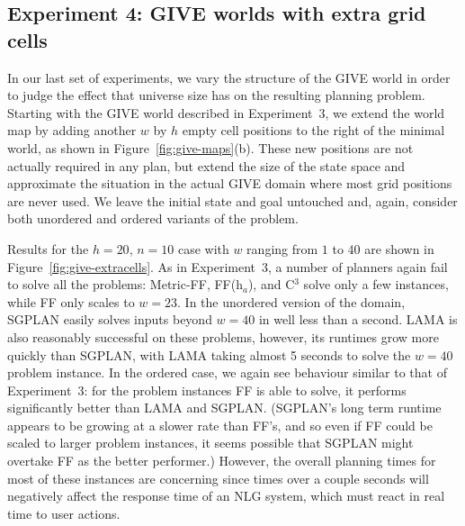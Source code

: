 \subsection{Experiment 4: GIVE worlds with extra grid cells}
\label{sec:experiment-4:-give}

In our last set of experiments, we vary the structure of the GIVE world in order
to judge the effect that universe size has on the resulting planning problem.
Starting with the GIVE world described in Experiment~3, we extend the world map
by adding another $w$ by $h$ empty cell positions to the right of the minimal
world, as shown in Figure~\ref{fig:give-maps}(b). These new positions are not
actually required in any plan, but extend the size of the state space and
approximate the situation in the actual GIVE domain where most grid positions
are never used. We leave the initial state and goal untouched and, again,
consider both unordered and ordered variants of the problem.

Results for the $h=20$, $n=10$ case with $w$ ranging from $1$ to $40$ are shown
in Figure~\ref{fig:give-extracells}. As in Experiment~3, a number of planners
again fail to solve all the problems: Metric-FF, FF(h$_a$), and C$^3$ solve only
a few instances, while FF only scales to $w=23$. In the unordered version of the
domain, SGPLAN easily solves inputs beyond $w=40$ in well less than a second.
LAMA is also reasonably successful on these problems, however, its runtimes grow
more quickly than SGPLAN, with LAMA taking almost 5 seconds to solve the $w=40$
problem instance. In the ordered case, we again see behaviour similar to that of
Experiment~3: for the problem instances FF is able to solve, it performs
significantly better than LAMA and SGPLAN. (SGPLAN's long term runtime
appears to be growing at a slower rate than FF's, and so even if FF could be
scaled to larger problem instances, it seems possible that SGPLAN might overtake
FF as the better performer.) However, the overall planning times for most of
these instances are concerning since times over a couple seconds will negatively
affect the response time of an NLG system, which must react in real time to user
actions.

